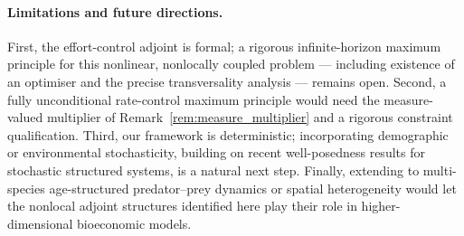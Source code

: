 \documentclass[pdflatex,sn-mathphys-num]{sn-jnl}
\theoremstyle{definition}
\theoremstyle{remark}
\begin{document}
\paragraph{Limitations and future directions.}
First, the effort-control adjoint is formal; a rigorous infinite-horizon
maximum principle for this nonlinear, nonlocally coupled problem --- including
existence of an optimiser and the precise transversality analysis --- remains
open. 
Second, a fully unconditional rate-control maximum principle would need
the measure-valued multiplier of Remark~\ref{rem:measure_multiplier} and a
rigorous constraint qualification.
Third, our framework is deterministic;
incorporating demographic or environmental stochasticity, building on recent
well-posedness results for stochastic structured systems, is a natural next
step. Finally, extending to multi-species age-structured predator--prey
dynamics or spatial heterogeneity would let the nonlocal adjoint structures
identified here play their role in higher-dimensional bioeconomic models.


\end{document}
